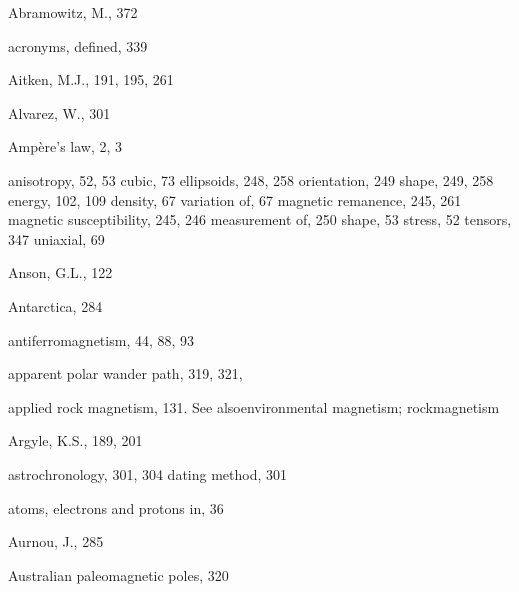 \documentclass[,plain]{tauxe}
\begin{document}
\setcounter{page}{479}
\begin{theindex}
  
  
  
  
  
  
  


  \item Abramowitz, M., 372
  \item acronyms, defined, 339
  \item Aitken, M.J., 191, 195, 261
  \item Alvarez, W., 301
  \item Amp\`ere's law, 2, 3
  \item anisotropy, 52, 53
    \subitem cubic, 73
    \subitem ellipsoids, 248, 258
      \subsubitem orientation, 249
      \subsubitem shape, 249, 258
    \subitem energy, 102, 109
    \subsubitem density, 67
    \subsubitem variation of, 67
    \subitem magnetic remanence, 245, 261
    \subitem magnetic susceptibility, 245, 246
      \subsubitem measurement of, 250
    \subitem shape, 53
    \subitem stress, 52
    \subitem tensors, 347
    \subitem uniaxial, 69
  \item Anson, G.L., 122
  \item Antarctica, 284
  \item antiferromagnetism, 44, 88, 93
  \item apparent polar wander path, 319, 321,
  \item applied rock magnetism, 131. See also\break environmental magnetism; rock\break magnetism 
		
  \item Argyle, K.S., 189, 201
  \item astrochronology, 301, 304
  \subitem dating method, 301
  \item atoms, electrons and protons in, 36
  \item Aurnou, J., 285
  \item Australian paleomagnetic poles, 320

  \indexspace


\end{theindex}
\end{document}
